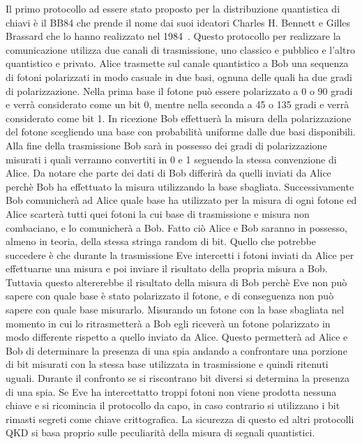 Il primo protocollo ad essere stato proposto per la distribuzione quantistica di chiavi \`e il BB84 che prende il nome dai suoi ideatori Charles H. Bennett e Gilles Brassard che lo hanno realizzato nel 1984~\cite{ Bennett_2014}.
Questo protocollo per realizzare la comunicazione utilizza due canali di trasmissione, uno classico e pubblico e l'altro quantistico e privato. Alice trasmette sul canale quantistico a Bob una sequenza di fotoni polarizzati in modo casuale in due basi, ognuna delle quali ha due gradi di polarizzazione. Nella prima base il fotone pu\`o essere polarizzato a 0 o 90 gradi e verr\`a considerato come un bit 0, mentre nella seconda a 45 o 135 gradi e verr\`a considerato come bit 1.
In ricezione Bob effettuer\`a la misura della polarizzazione del fotone scegliendo una base con probabilit\`a uniforme dalle due basi disponibili. Alla fine della trasmissione Bob sar\`a in possesso dei gradi di polarizzazione misurati i quali verranno convertiti in 0 e 1 seguendo la stessa convenzione di Alice. Da notare che parte dei dati di Bob differir\`a da quelli inviati da Alice perch\`e Bob ha effettuato la misura utilizzando la base sbagliata.
Successivamente Bob comunicher\`a ad Alice quale base ha utilizzato per la misura di ogni fotone ed Alice scarter\`a tutti quei fotoni la cui base di trasmissione e misura non combaciano, e lo comunicher\`a a Bob. Fatto ci\`o Alice e Bob saranno in possesso, almeno in teoria, della stessa stringa random di bit.
Quello che potrebbe succedere \`e che durante la trasmissione Eve intercetti i fotoni inviati da Alice per effettuarne una misura e poi inviare il risultato della propria misura a Bob. Tuttavia questo altererebbe il risultato della misura di Bob perch\`e Eve non pu\`o sapere con quale base \`e stato polarizzato il fotone, e di conseguenza non pu\`o sapere con quale base misurarlo. Misurando un fotone con la base sbagliata nel momento in cui lo ritrasmetter\`a a Bob egli ricever\`a un fotone polarizzato in modo differente rispetto a quello inviato da Alice. Questo permetter\`a ad Alice e Bob di determinare la presenza di una spia andando a confrontare una porzione di bit misurati con la stessa base utilizzata in trasmissione e quindi ritenuti uguali. Durante il confronto se si riscontrano bit diversi si determina la presenza di una spia. Se Eve ha intercettatto troppi fotoni non viene prodotta nessuna chiave e si ricomincia il protocollo da capo, in caso contrario si utilizzano i bit rimasti segreti come chiave crittografica\cite{zhao_development_2018}. La sicurezza di questo ed altri protocolli QKD si basa proprio sulle peculiarit\`a della misura di segnali quantistici.

